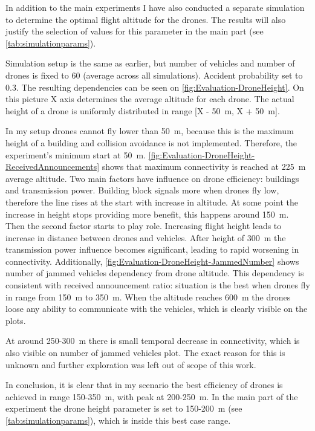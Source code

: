 \documentclass[]{nsm-thesis}
\begin{document}
In addition to the main experiments I have also conducted a separate simulation to determine the optimal flight altitude for the drones. The results will also justify the selection of values for this parameter in the main part (see \cref{tab:simulationparams}).

Simulation setup is the same as earlier, but number of vehicles and number of drones is fixed to 60 (average across all simulations). Accident probability set to 0.3. The resulting dependencies can be seen on \cref{fig:Evaluation-DroneHeight}. On this picture X axis determines the average altitude for each drone. The actual height of a drone is uniformly distributed in range [X - \SI{50}{\meter}, X + \SI{50}{\meter}].

In my setup drones cannot fly lower than \SI{50}{\meter}, because this is the maximum height of a building and collision avoidance is not implemented. Therefore, the experiment's minimum start at \SI{50}{\meter}. \cref{fig:Evaluation-DroneHeight-ReceivedAnnouncements} shows that maximum connectivity is reached at \SI{225}{\meter} average altitude. Two main factors have influence on drone efficiency: buildings and transmission power. Building block signals more when drones fly low, therefore the line rises at the start with increase in altitude. At some point the increase in height stops providing more benefit, this happens around \SI{150}{\meter}. Then the second factor starts to play role. Increasing flight height leads to increase in distance between drones and vehicles. After height of \SI{300}{\meter} the transmission power influence becomes significant, leading to rapid worsening in connectivity. Additionally, \cref{fig:Evaluation-DroneHeight-JammedNumber} shows number of jammed vehicles dependency from drone altitude. This dependency is consistent with received announcement ratio: situation is the best when drones fly in range from \SI{150}{\meter} to \SI{350}{\meter}. When the altitude reaches \SI{600}{\meter} the drones loose any ability to communicate with the vehicles, which is clearly visible on the plots. 

At around 250-\SI{300}{\meter} there is small temporal decrease in connectivity, which is also visible on number of jammed vehicles plot.
The exact reason for this is unknown and further exploration was left out of scope of this work.

In conclusion, it is clear that in my scenario the best efficiency of drones is achieved in range 150-\SI{350}{\meter}, with peak at 200-\SI{250}{\meter}. In the main part of the experiment the drone height parameter is set to 150-\SI{200}{\meter} (see \cref{tab:simulationparams}), which is inside this best case range.
\end{document}
